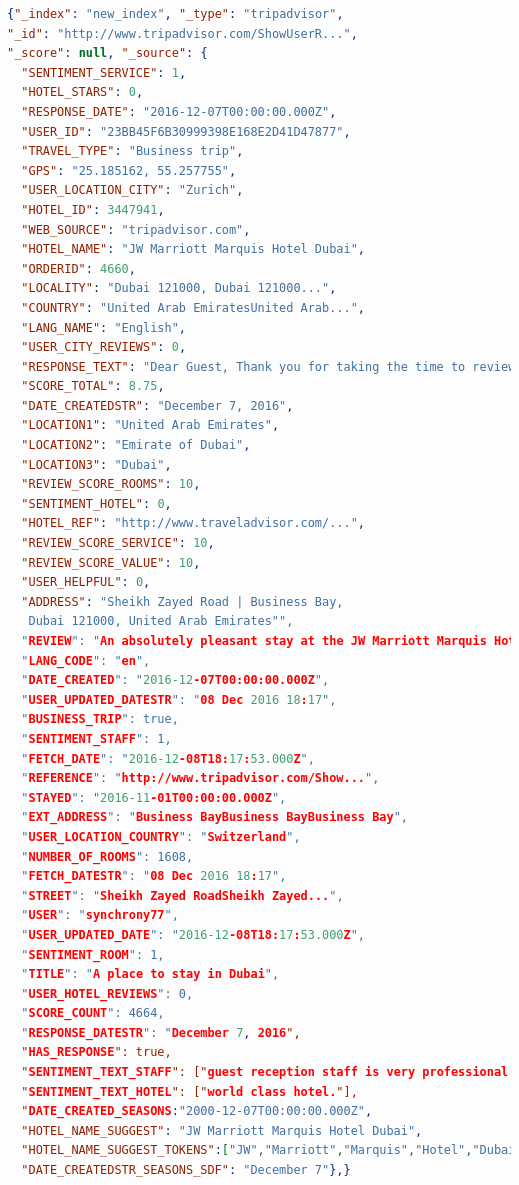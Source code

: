 \documentclass[czech,BP]{thesiskiv}
\begin{document}
\begin{lstlisting}[caption=Příkald recenze, language=json]
{"_index": "new_index", "_type": "tripadvisor",
"_id": "http://www.tripadvisor.com/ShowUserR...",
"_score": null, "_source": {
  "SENTIMENT_SERVICE": 1,
  "HOTEL_STARS": 0,
  "RESPONSE_DATE": "2016-12-07T00:00:00.000Z",
  "USER_ID": "23BB45F6B30999398E168E2D41D47877",
  "TRAVEL_TYPE": "Business trip",
  "GPS": "25.185162, 55.257755",
  "USER_LOCATION_CITY": "Zurich",
  "HOTEL_ID": 3447941,
  "WEB_SOURCE": "tripadvisor.com",
  "HOTEL_NAME": "JW Marriott Marquis Hotel Dubai",
  "ORDERID": 4660,
  "LOCALITY": "Dubai 121000, Dubai 121000...",
  "COUNTRY": "United Arab EmiratesUnited Arab...",
  "LANG_NAME": "English",
  "USER_CITY_REVIEWS": 0,
  "RESPONSE_TEXT": "Dear Guest, Thank you for taking the time to review your stay with us. I am very pleased to hear that our staff made your stay pleasant. Looking forward to seeing you again soon. Sincerely, Balan ParavantavidaHotel Manager",
  "SCORE_TOTAL": 8.75,
  "DATE_CREATEDSTR": "December 7, 2016",
  "LOCATION1": "United Arab Emirates",
  "LOCATION2": "Emirate of Dubai",
  "LOCATION3": "Dubai",
  "REVIEW_SCORE_ROOMS": 10,
  "SENTIMENT_HOTEL": 0,
  "HOTEL_REF": "http://www.traveladvisor.com/...",
  "REVIEW_SCORE_SERVICE": 10,
  "REVIEW_SCORE_VALUE": 10,
  "USER_HELPFUL": 0,
  "ADDRESS": "Sheikh Zayed Road | Business Bay,
   Dubai 121000, United Arab Emirates"",
  "REVIEW": "An absolutely pleasant stay at the JW Marriott Marquis Hotel in Dubai. The guest reception staff is very professional and helpful. I would like to thank Mahesh for his assistance. The rooms are perfectly clean and the executive lounge is unique for the frequent travellers. A world class hotel.",   
  "LANG_CODE": "en",
  "DATE_CREATED": "2016-12-07T00:00:00.000Z",
  "USER_UPDATED_DATESTR": "08 Dec 2016 18:17",
  "BUSINESS_TRIP": true,
  "SENTIMENT_STAFF": 1,
  "FETCH_DATE": "2016-12-08T18:17:53.000Z",
  "REFERENCE": "http://www.tripadvisor.com/Show...",
  "STAYED": "2016-11-01T00:00:00.000Z",
  "EXT_ADDRESS": "Business BayBusiness BayBusiness Bay",
  "USER_LOCATION_COUNTRY": "Switzerland",
  "NUMBER_OF_ROOMS": 1608,
  "FETCH_DATESTR": "08 Dec 2016 18:17",
  "STREET": "Sheikh Zayed RoadSheikh Zayed...",
  "USER": "synchrony77",
  "USER_UPDATED_DATE": "2016-12-08T18:17:53.000Z",
  "SENTIMENT_ROOM": 1,
  "TITLE": "A place to stay in Dubai",
  "USER_HOTEL_REVIEWS": 0,
  "SCORE_COUNT": 4664,
  "RESPONSE_DATESTR": "December 7, 2016",
  "HAS_RESPONSE": true,
  "SENTIMENT_TEXT_STAFF": ["guest reception staff is very professional and helpful."],
  "SENTIMENT_TEXT_HOTEL": ["world class hotel."],
  "DATE_CREATED_SEASONS:"2000-12-07T00:00:00.000Z",
  "HOTEL_NAME_SUGGEST": "JW Marriott Marquis Hotel Dubai",
  "HOTEL_NAME_SUGGEST_TOKENS":["JW","Marriott","Marquis","Hotel","Dubai"],
  "DATE_CREATEDSTR_SEASONS_SDF": "December 7"},}
	\end{lstlisting}
	
\end{document}
